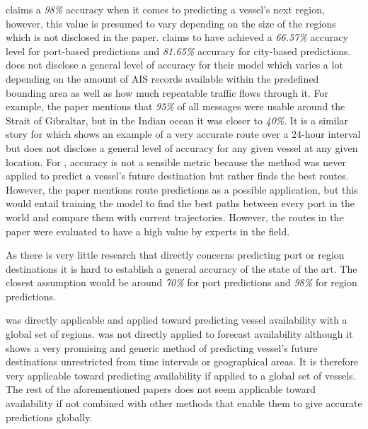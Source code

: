 
\cite{lechtenberg2019} claims a \textit{98\%} accuracy when it comes to predicting a vessel’s next region, however, this value is presumed to vary depending on the size of the regions which is not disclosed in the paper. \cite{ZHANG2020102729} claims to have achieved a \textit{66.57\%} accuracy level for port-based predictions and \textit{81.65\%} accuracy for city-based predictions. \cite{pallotta} does not disclose a general level of accuracy for their model which varies a lot depending on the amount of AIS records available within the predefined bounding area as well as how much repeatable traffic flows through it. For example, the paper mentions that \textit{95\%} of all messages were usable around the Strait of Gibraltar, but in the Indian ocean it was closer to \textit{40\%}. It is a similar story for \cite{Daranda2016NeuralNA} which shows an example of a very accurate route over a 24-hour interval but does not disclose a general level of accuracy for any given vessel at any given location. For \cite{Pelizzari2016GeneticAF}, accuracy is not a sensible metric because the method was never applied to predict a vessel’s future destination but rather finds the best routes. However, the paper mentions route predictions as a possible application, but this would entail training the model to find the best paths between every port in the world and compare them with current trajectories. However, the routes in the paper were evaluated to have a high value by experts in the field.

As there is very little research that directly concerns predicting port or region destinations it is hard to establish a general accuracy of the state of the art. The closest assumption would be around \textit{70\%} for port predictions and \textit{98\%} for region predictions.


\cite{lechtenberg2019} was directly applicable and applied toward predicting vessel availability with a global set of regions. \cite{ZHANG2020102729} was not directly applied to forecast availability although it shows a very promising and generic method of predicting vessel’s future destinations unrestricted from time intervals or geographical areas. It is therefore very applicable toward predicting availability if applied to a global set of vessels. The rest of the aforementioned papers does not seem applicable toward availability if not combined with other methods that enable them to give accurate predictions globally.

